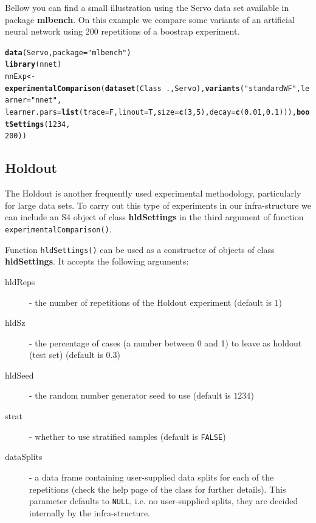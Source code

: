 \documentclass[10pt,a4paper]{article}\usepackage[]{graphicx}\usepackage[]{color}
\makeatletter
\newcommand{\hlnum}[1]{\textcolor[rgb]{0.686,0.059,0.569}{#1}}%
\newcommand{\hlstr}[1]{\textcolor[rgb]{0.192,0.494,0.8}{#1}}%
\newcommand{\hlopt}[1]{\textcolor[rgb]{0,0,0}{#1}}%
\newcommand{\hlstd}[1]{\textcolor[rgb]{0.345,0.345,0.345}{#1}}%
\newcommand{\hlkwb}[1]{\textcolor[rgb]{0.69,0.353,0.396}{#1}}%
\newcommand{\hlkwc}[1]{\textcolor[rgb]{0.333,0.667,0.333}{#1}}%
\newcommand{\hlkwd}[1]{\textcolor[rgb]{0.737,0.353,0.396}{\textbf{#1}}}%
\newenvironment{kframe}{%
 \def\at@end@of@kframe{}%
 \ifinner\ifhmode%
  \def\at@end@of@kframe{\end{minipage}}%
  \begin{minipage}{\columnwidth}%
 \fi\fi%
 \def\FrameCommand##1{\hskip\@totalleftmargin \hskip-\fboxsep
 \colorbox{shadecolor}{##1}\hskip-\fboxsep
     \hskip-\linewidth \hskip-\@totalleftmargin \hskip\columnwidth}%
 \MakeFramed {\advance\hsize-\width
   \@totalleftmargin\z@ \linewidth\hsize
   \@setminipage}}%
 {\par\unskip\endMakeFramed%
 \at@end@of@kframe}
\newenvironment{knitrout}{}{} %
\makeatother
\begin{document}
Bellow you can find a small illustration using the Servo data set available in package \textbf{mlbench}. On this example we compare some variants of an artificial neural network using 200 repetitions of a boostrap experiment.

\begin{knitrout}
\color{fgcolor}\begin{kframe}
\begin{alltt}
\hlkwd{data}\hlstd{(Servo,} \hlkwc{package} \hlstd{=} \hlstr{"mlbench"}\hlstd{)}
\hlkwd{library}\hlstd{(nnet)}
\hlstd{nnExp} \hlkwb{<-} \hlkwd{experimentalComparison}\hlstd{(}\hlkwd{dataset}\hlstd{(Class} \hlopt{~} \hlstd{., Servo),} \hlkwd{variants}\hlstd{(}\hlstr{"standardWF"}\hlstd{,} \hlkwc{learner} \hlstd{=} \hlstr{"nnet"}\hlstd{,}
    \hlkwc{learner.pars} \hlstd{=} \hlkwd{list}\hlstd{(}\hlkwc{trace} \hlstd{= F,} \hlkwc{linout} \hlstd{= T,} \hlkwc{size} \hlstd{=} \hlkwd{c}\hlstd{(}\hlnum{3}\hlstd{,} \hlnum{5}\hlstd{),} \hlkwc{decay} \hlstd{=} \hlkwd{c}\hlstd{(}\hlnum{0.01}\hlstd{,} \hlnum{0.1}\hlstd{))),} \hlkwd{bootSettings}\hlstd{(}\hlnum{1234}\hlstd{,}
    \hlnum{200}\hlstd{))}
\end{alltt}
\end{kframe}
\end{knitrout}


\subsection{Holdout}

The Holdout is another frequently used experimental methodology,
particularly for large data sets. To carry out this type of
experiments in our infra-structure we can include an S4 object of
class \textbf{hldSettings} in the third argument of function
\texttt{experimentalComparison()}.

Function \texttt{hldSettings()} can be used as a constructor of
objects of class \textbf{hldSettings}. It accepts the following
arguments:

\begin{description}
\item[hldReps] - the number of repetitions of the Holdout experiment (default is $1$)
\item[hldSz] - the percentage  of cases (a number between 0 and 1) to leave as holdout (test set) (default is $0.3$)
\item[hldSeed] - the random number generator seed to use (default is $1234$)
\item[strat] - whether to use stratified samples (default is \texttt{FALSE})
\item[dataSplits] - a data frame containing user-supplied data splits
  for each of the repetitions (check the help page of the
  class for further details). This parameter defaults to
  \texttt{NULL}, i.e. no user-supplied splits, they are decided
  internally by the infra-structure.
\end{description}
\end{document}
